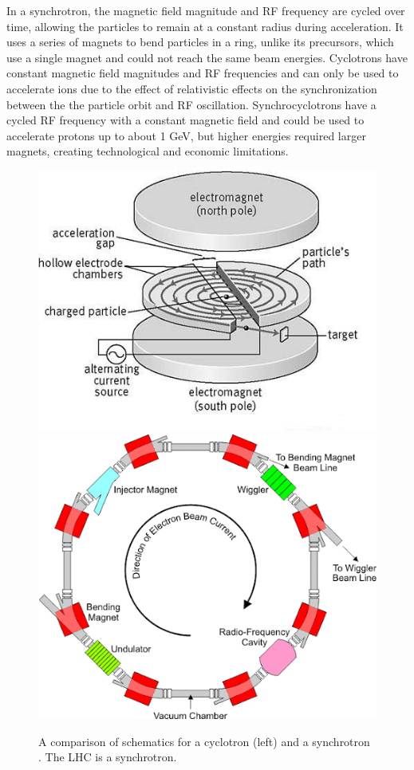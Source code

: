 In a synchrotron, the magnetic field magnitude and RF frequency are cycled over time, allowing the particles to remain at a constant radius during acceleration. It uses a series of magnets to bend particles in a ring, unlike its precursors, which use a single magnet and could not reach the same beam energies. Cyclotrons have constant magnetic field magnitudes and RF frequencies and can only be used to accelerate ions due to the effect of relativistic effects on the synchronization between the the particle orbit and RF oscillation. Synchrocyclotrons have a cycled RF frequency with a constant magnetic field and could be used to accelerate protons up to about 1 GeV, but higher energies required larger magnets, creating technological and economic limitations. \cite{synchrotrons} 

\begin{figure}[htbp]
\centering
\includegraphics[width=.35\textwidth]{figures/Detector/cyclo-schematic.png}
\includegraphics[width=.35\textwidth]{figures/Detector/synchro-schematic.png}
\caption{A comparison of schematics for a cyclotron (left) \cite{cyclo-pic} and a synchrotron \cite{synchro-pic}. The \ac{LHC} is a synchrotron.}
\end{figure}



